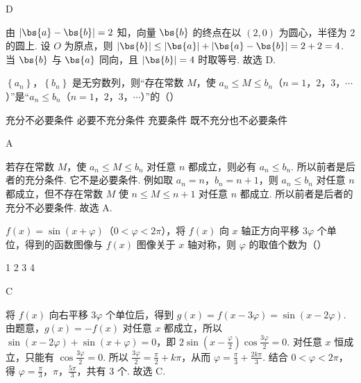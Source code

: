 \begin{answer}
D
\end{answer}

\begin{solution}
由 \( \left| \bs{a}-\bs{b} \right|=2 \) 知，向量 \( \bs{b} \) 的终点在以 \( \left( 2,0 \right) \) 为圆心，半径为 2 的圆上. 设 \(O\) 为原点，则 \( \left| \bs{b} \right|\le \left| \bs{a} \right|+\left| \bs{a}-\bs{b} \right|=2+2=4 \). 当 \( \bs{b} \) 与 \( \bs{a} \) 同向，且 \( \left| \bs{b} \right|=4 \) 时取等号. 故选 D.
\end{solution}

\begin{problem}
\( \left\{ a_n \right\} \)，\( \left\{ b_n \right\} \) 是无穷数列，则“存在常数 \(M\)，使 \( a_n\le M\le b_n \)（\(n=1\)，\(2\)，\(3\)，\(\cdots\)）”是“\( a_n\le b_n \)（\(n=1\)，\(2\)，\(3\)，\(\cdots\)）”的（\quad）

\choices
    {充分不必要条件}
    {必要不充分条件}
    {充要条件}
    {既不充分也不必要条件}
\end{problem}

\begin{answer}
A
\end{answer}

\begin{solution}
若存在常数 \(M\)，使 \( a_n\le M\le b_n \) 对任意 \( n \) 都成立，则必有 \( a_n\le b_n \). 所以前者是后者的充分条件.
它不是必要条件. 例如取 \( a_n=n \)，\( b_n=n+1 \)，则 \( a_n\le b_n \) 对任意 \( n \) 都成立，但不存在常数 \(M\) 使 \( n\le M\le n+1 \) 对任意 \( n \) 都成立.
所以前者是后者的充分不必要条件. 故选 A.
\end{solution}

\begin{problem}
\( f(x)=\sin\left( x+\varphi \right) \)（\( 0<\varphi<2\pi \)），将 \( f(x) \) 向 \( x \) 轴正方向平移 \( 3\varphi \) 个单位，得到的函数图像与 \( f(x) \) 图像关于 \( x \) 轴对称，则 \( \varphi \) 的取值个数为（\quad）

\choices
    {1}
    {2}
    {3}
    {4}
\end{problem}

\begin{answer}
C
\end{answer}

\begin{solution}
将 \( f(x) \) 向右平移 \( 3\varphi \) 个单位后，得到 \( g(x)=f\left( x-3\varphi \right)=\sin\left( x-2\varphi \right) \).
由题意，\( g(x)=-f(x) \) 对任意 \( x \) 都成立，所以 \( \sin\left( x-2\varphi \right)+\sin\left( x+\varphi \right)=0 \)，即 \( 2\sin\left( x-\frac{\varphi}{2} \right)\cos\frac{3\varphi}{2}=0 \).
对任意 \( x \) 恒成立，只能有 \( \cos\frac{3\varphi}{2}=0 \). 所以 \( \frac{3\varphi}{2}=\frac{\pi}{2}+k\pi \)，从而 \( \varphi=\frac{\pi}{3}+\frac{2k\pi}{3} \).
结合 \( 0<\varphi<2\pi \)，得 \(\varphi=\frac{\pi}{3}\)，\(\pi\)，\(\frac{5\pi}{3}\)，共有 3 个. 故选 C.
\end{solution}

